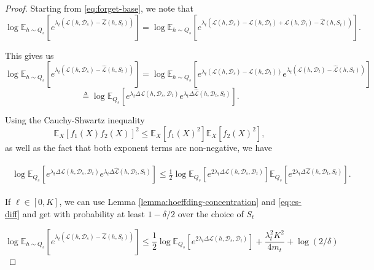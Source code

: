 \documentclass{article}
\theoremstyle{plain}
\theoremstyle{definition}
\theoremstyle{remark}
\begin{document}
\begin{proof}
    Starting from \eqref{eq:forget-base}, we note that
    $$\log\mathbb{E}_{h\sim Q_{s}}\left [e^{\lambda_t(\mathcal{L}(h,\mathcal{D}_s)-\hat{\mathcal{L}}(h,S_t))} \right ] = \log\mathbb{E}_{h\sim Q_{s}}\left [e^{\lambda_t(\mathcal{L}(h,\mathcal{D}_s)-\mathcal{L}(h,\mathcal{D}_t)+\mathcal{L}(h,\mathcal{D}_t)-\hat{\mathcal{L}}(h,S_t))} \right ].$$

    This gives us 
$$\log\mathbb{E}_{h\sim Q_{s}}\left [e^{\lambda_t(\mathcal{L}(h,\mathcal{D}_s)-\hat{\mathcal{L}}(h,S_t))} \right ] = \log\mathbb{E}_{h\sim Q_{s}}\left [e^{\lambda_t(\mathcal{L}(h,\mathcal{D}_s)-\mathcal{L}(h,\mathcal{D}_t))}e^{\lambda_t(\mathcal{L}(h,\mathcal{D}_t)-\hat{\mathcal{L}}(h,S_t))} \right ]$$
$$\triangleq \log\mathbb{E}_{Q_{s}}\left [e^{\lambda_t\Delta\mathcal{L}(h,\mathcal{D}_s, \mathcal{D}_t)}e^{\lambda_t\Delta\hat{\mathcal{L}}(h,\mathcal{D}_t, S_t)} \right ].$$

Using the Cauchy-Shwartz inequality $$\mathbb{E}_{X}\left [f_1(X)f_2(X)\right ]^2\leq \mathbb{E}_{X}\left [f_1(X)^2\right ]\mathbb{E}_{X}\left [f_2(X)^2\right ],$$
as well as the fact that both exponent terms are non-negative, we have

\begin{align} \label{eq:cs-diff}
\begin{split}
\log\mathbb{E}_{Q_{s}}\left [e^{\lambda_t\Delta\mathcal{L}(h,\mathcal{D}_s, \mathcal{D}_t)}e^{\lambda_t\Delta\hat{\mathcal{L}}(h,\mathcal{D}_t, S_t)} \right ]\leq \frac{1}{2}\log\mathbb{E}_{Q_{s}}\left [e^{2\lambda_t\Delta\mathcal{L}(h,\mathcal{D}_s, \mathcal{D}_t)}\right ]\mathbb{E}_{Q_{s}}\left [e^{2\lambda_t\Delta\hat{\mathcal{L}}(h,\mathcal{D}_t, S_t)} \right ].
\end{split}
\end{align}

If $\ell\in [0,K]$, we can use Lemma \ref{lemma:hoeffding-concentration} and \eqref{eq:cs-diff} and get with probability at least $1-\delta/2$ over the choice of $S_t$

$$\log\mathbb{E}_{h\sim Q_{s}}\left [e^{\lambda_t(\mathcal{L}(h,\mathcal{D}_s)-\hat{\mathcal{L}}(h,S_t))} \right ]\leq \frac{1}{2}\log\mathbb{E}_{Q_{s}}\left [e^{2\lambda_t\Delta\mathcal{L}(h,\mathcal{D}_s, \mathcal{D}_t)}\right ]+\frac{\lambda_t^2K^2}{4m_t}+\log(2/\delta)$$

\end{proof}

\end{document}
